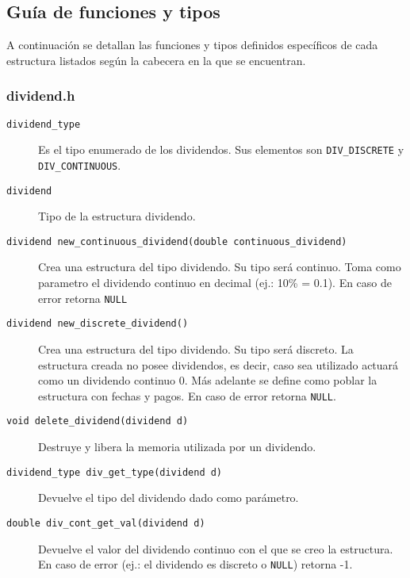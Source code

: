 \documentclass[12pt,a4paper,final]{article}
\begin{document}
	\subsection{Guía de funciones y tipos}
		A continuación se detallan las funciones y tipos definidos específicos de cada estructura
		listados según la cabecera en la que se encuentran.
		
		\subsubsection{dividend.h}
			\begin{description}
			
				\item [\texttt{dividend\_type}]
					Es el tipo enumerado de los dividendos. Sus elementos son
					\texttt{DIV\_DISCRETE} y \texttt{DIV\_CONTINUOUS}.
					
				\item [\texttt{dividend}]
					Tipo de la estructura dividendo.
				
				\item [\texttt{dividend new\_continuous\_dividend(double continuous\_dividend)}]
					Crea una estructura del tipo dividendo. Su tipo será continuo.
					Toma como parametro el dividendo continuo en decimal (ej.: 10\% = 0.1).
					En caso de error retorna \texttt{NULL}
					
				\item [\texttt{dividend new\_discrete\_dividend()}]
					Crea una estructura del tipo dividendo. Su tipo será discreto.
					La estructura creada no posee dividendos, es decir, caso sea utilizado
					actuará como un dividendo continuo 0. Más adelante se define como poblar
					la estructura con fechas y pagos.
					En caso de error retorna \texttt{NULL}.
					
				\item [\texttt{void delete\_dividend(dividend d)}]
					Destruye y libera la memoria utilizada por un dividendo.
					
				\item [\texttt{dividend\_type div\_get\_type(dividend d)}]
					Devuelve el tipo del dividendo dado como parámetro.
					
				\item [\texttt{double div\_cont\_get\_val(dividend d)}]
					Devuelve el valor del dividendo continuo con el que se creo la estructura.
					En caso de error (ej.: el dividendo es discreto o \texttt{NULL}) retorna -1.
					

\end{description}
\end{document}
